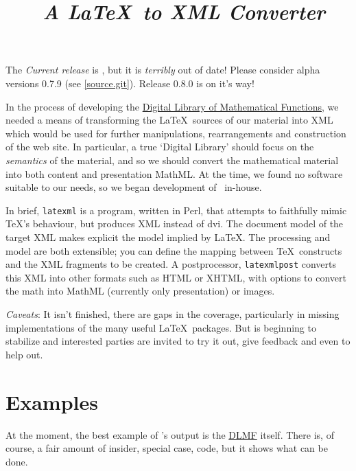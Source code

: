 \documentclass{article}
\title{\LaTeXML\ \emph{A \LaTeX\ to XML Converter}}
\begin{document}
\label{top}
\maketitle

The \emph{Current release} is ,
but it is \emph{terribly} out of date!
Please consider alpha versions 0.7.9 (see \ref{source.git}).
Release 0.8.0 is on it's way!

In the process of developing the
\href{http://dlmf.nist.gov/}{Digital Library of Mathematical Functions},
we needed a means of transforming
the \LaTeX\ sources of our material into XML which would be used
for further manipulations, rearrangements and construction of the web site.
In particular, a true `Digital Library' should focus on the \emph{semantics}
of the material, and so we should convert the mathematical material into both
content and presentation MathML.
At the time, we found no software suitable to our needs, so we began
development of \LaTeXML\ in-house.  

In brief, \texttt{latexml} is a program, written in Perl, that attempts to
faithfully mimic \TeX's behaviour, but produces XML instead of dvi.
The document model of the target XML makes explicit the model implied
by \LaTeX.
The processing and model are both extensible; you can define
the mapping between \TeX\ constructs and the XML fragments to be created.
A postprocessor, \texttt{latexmlpost} converts this
XML into other formats such as HTML or XHTML, with options
to convert the math into MathML (currently only presentation) or images.

\emph{Caveats}: It isn't finished, there are gaps in the coverage,
particularly in missing implementations of the many useful \LaTeX\ packages.
But is beginning to stabilize and interested parties
are invited to try it out, give feedback and even to help out.


\section{Examples}\label{examples}
At the moment, the best example of \LaTeXML's output is 
the \href{http://dlmf.nist.gov/}{DLMF} itself.
There is, of course, a fair amount of insider, special case,
code, but it shows what can be done.
\end{document}
